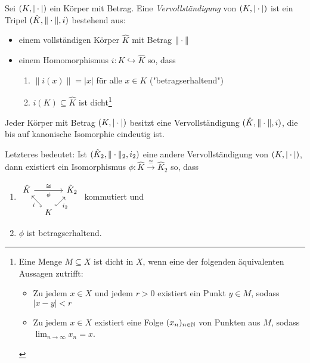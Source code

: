 \documentclass[../main.tex]{subfiles}
\begin{document}
\begin{definition}%
    Sei $(K,|\cdot|)$ ein Körper mit Betrag. Eine \emph{Vervollständigung} von $(K,|\cdot|)$ ist ein Tripel $(\hat{K},\|\cdot\|,i)$ bestehend aus:
    \begin{itemize}
        \item einem vollständigen Körper $\hat{K}$ mit Betrag $\|\cdot\|$
        \item einem Homomorphismus $i:K \hookrightarrow \hat{K}$ so, dass
        \begin{enumerate}
            \item $\|i(x)\| = |x|$ für alle $x\in K$ ("betragserhaltend")
            \item $i(K)\subseteq \hat{K}$ ist dicht\footnote{
            Eine Menge $M\subseteq X$ ist dicht in $X$, wenn eine der folgenden äquivalenten Aussagen zutrifft:
            \begin{itemize}
                \item Zu jedem $x\in X$ und jedem $r>0$ existiert ein Punkt $y\in M$, sodass $|x-y|<r$
                \item Zu jedem $x\in X$ existiert eine Folge $(x_n)_{n\in\mathbb{N}}$ von Punkten aus $M$, sodass $\lim_{n\rightarrow\infty} x_n = x$.
            \end{itemize}
            }
        \end{enumerate}
    \end{itemize}
\end{definition}

\begin{theorem}
    Jeder Körper mit Betrag $(K,|\cdot|)$ besitzt eine Vervollständigung $(\hat{K}, \|\cdot\|,i)$, die bis auf kanonische Isomorphie eindeutig ist.
\end{theorem}
Letzteres bedeutet:
Ist $(\hat{K}_2, \|\cdot\|_2,i_2)$ eine andere Vervollständigung von $(K,|\cdot|)$, dann existiert ein Isomorphismus $\phi:\hat{K}\overset{\cong}{\rightarrow} \hat{K}_2$ so, dass
\begin{enumerate}[noitemsep]
    \item $%
    \begin{tikzcd}[column sep=0.3cm, row sep=0.4cm]
    \hat{K} \arrow[rr, "\cong", "\phi"'] & & \hat{K}_2 \\
                                & K \arrow[lu, "i", hook] \arrow[ru, "i_2"', hook] &          
    \end{tikzcd}$ kommutiert und
    \item $\phi$ ist betragserhaltend.
\end{enumerate}
\end{document}

